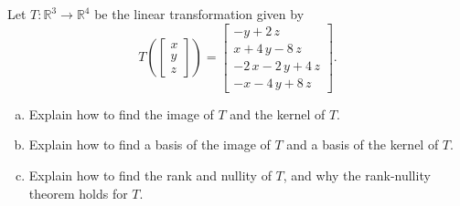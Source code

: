 
\begin{exerciseStatement}
 Let \(T:\mathbb{R}^ 3  \to \mathbb{R}^ 4 \) be the linear transformation given by \[T\left(  \left[\begin{array}{c}
x \\
y \\
z
\end{array}\right]  \right) =  \left[\begin{array}{c}
-y + 2 \, z \\
x + 4 \, y - 8 \, z \\
-2 \, x - 2 \, y + 4 \, z \\
-x - 4 \, y + 8 \, z
\end{array}\right] .\]
\begin{enumerate}[(a)]
\item Explain how to find the image of \(T\) and the kernel of \(T\).
\item Explain how to find a basis of the image of \(T\) and a basis of the kernel of \(T\).
\item Explain how to find the rank and nullity of \(T\), and why the rank-nullity theorem holds for \(T\).
\end{enumerate}
    
\end{exerciseStatement}
    
